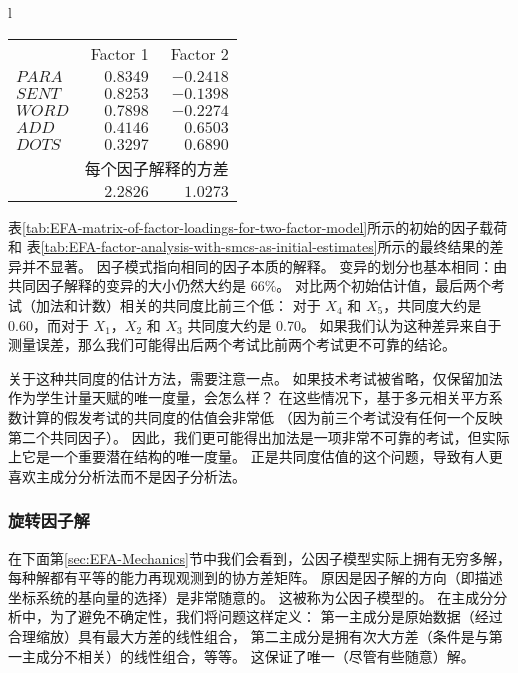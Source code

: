 \begin{table}[htb]
{\begin{tabular}{l}
\begin{minipage}{0.5\textwidth}
\begin{tabular}{lrr}
                    & Factor 1 & Factor 2 \\ 
                    $ PARA $ & $0.8349$ & $-0.2418$ \\
                    $ SENT $ & $0.8253$ & $-0.1398$ \\
                    $ WORD $ & $0.7898$ & $-0.2274$ \\
                    $ ADD  $ & $0.4146$ & $ 0.6503$ \\
                    $ DOTS $ & $0.3297$ & $ 0.6890$ \\
                    & \multicolumn{2}{c}{每个因子解释的方差} \\
                    & $2.2826$ & $1.0273$ \\ 
                \end{tabular}
            \end{minipage}
        \end{tabular}
    }
\end{table}

表\ref{tab:EFA-matrix-of-factor-loadings-for-two-factor-model}所示的初始的因子载荷和
表\ref{tab:EFA-factor-analysis-with-smcs-as-initial-estimates}所示的最终结果的差异并不显著。
因子模式指向相同的因子本质的解释。
变异的划分也基本相同：由共同因子解释的变异的大小仍然大约是 66\%。
对比两个初始估计值，最后两个考试（加法和计数）相关的共同度比前三个低：
对于 $ X_4 $ 和 $ X_5 $，共同度大约是 0.60，而对于 $ X_1 $，$ X_2 $ 和 $ X_3 $ 共同度大约是 0.70。
如果我们认为这种差异来自于测量误差，那么我们可能得出后两个考试比前两个考试更不可靠的结论。

关于这种共同度的估计方法，需要注意一点。
如果技术考试被省略，仅保留加法作为学生计量天赋的唯一度量，会怎么样？
在这些情况下，基于多元相关平方系数计算的假发考试的共同度的估值会非常低
（因为前三个考试没有任何一个反映第二个共同因子）。
因此，我们更可能得出加法是一项非常不可靠的考试，但实际上它是一个重要潜在结构的唯一度量。
正是共同度估值的这个问题，导致有人更喜欢主成分分析法而不是因子分析法。

\subsubsection{旋转因子解}

在下面第\ref{sec:EFA-Mechanics}节中我们会看到，公因子模型实际上拥有无穷多解，
每种解都有平等的能力再现观测到的协方差矩阵。
原因是因子解的方向（即描述坐标系统的基向量的选择）是非常随意的。
这被称为公因子模型的。
在主成分分析中，为了避免不确定性，我们将问题这样定义：
第一主成分是原始数据（经过合理缩放）具有最大方差的线性组合，
第二主成分是拥有次大方差（条件是与第一主成分不相关）的线性组合，等等。
这保证了唯一（尽管有些随意）解。

